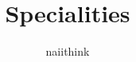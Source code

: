 \documentclass[a4paper]{report}
\title{Specialities}
\author{naiithink}
\date{}
\begin{document}
\begin{titlepage}
\maketitle
\end{titlepage}

\tableofcontents

\newpage
{}
\end{document}
